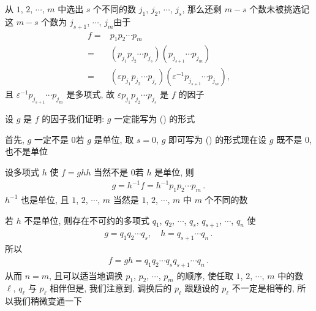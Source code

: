 \begin{pf}
    从 $1$, $2$, $\cdots$, $m$ 中选出 $s$ 个不同的数 $j_1$, $j_2$, $\cdots$, $j_s$, 那么还剩 $m-s$ 个数未被挑选\period 记这 $m-s$ 个数为 $j_{s+1}$, $\cdots$, $j_m$\period 由于
    \begin{align*}
        f
        = {} & p_1 p_2 \cdots p_m                                                                          \\
        = {} & (p_{j_1} p_{j_2} \cdots p_{j_s}) (p_{j_{s+1}} \cdots p_{j_m})                               \\
        = {} & (\varepsilon p_{j_1} p_{j_2} \cdots p_{j_s}) (\varepsilon^{-1} p_{j_{s+1}} \cdots p_{j_m}),
    \end{align*}
    且 $\varepsilon^{-1} p_{j_{s+1}} \cdots p_{j_m}$ 是多项式, 故 $\varepsilon p_{j_1} p_{j_2} \cdots p_{j_s}$ 是 $f$ 的因子\period

    设 $g$ 是 $f$ 的因子\period 我们证明: $g$ 一定能写为 (\myStar) 的形式\period

    首先, $g$ 一定不是 $0$\period 若 $g$ 是单位, 取 $s = 0$, $g$ 即可写为 (\myStar) 的形式\period 现在设 $g$ 既不是 $0$, 也不是单位\period

    设多项式 $h$ 使 $f = gh$\period $h$ 当然不是 $0$\period 若 $h$ 是单位, 则
    \begin{align*}
        g = h^{-1} f = h^{-1} p_1 p_2 \cdots p_m \period
    \end{align*}
    $h^{-1}$ 也是单位, 且 $1$, $2$, $\cdots$, $m$ 当然是 $1$, $2$, $\cdots$, $m$ 中 $m$ 个不同的数\period

    若 $h$ 不是单位, 则存在不可约的多项式 $q_1$, $q_2$, $\cdots$, $q_s$, $q_{s+1}$, $\cdots$, $q_n$ 使
    \begin{align*}
        g = q_1 q_2 \cdots q_s, \quad h = q_{s+1} \cdots q_n \period
    \end{align*}
    所以
    \begin{align*}
        f = gh = q_1 q_2 \cdots q_s q_{s+1} \cdots q_n \period
    \end{align*}
    从而 $n = m$, 且可以适当地调换 $p_1$, $p_2$, $\cdots$, $p_m$ 的顺序, 使任取 $1$, $2$, $\cdots$, $m$ 中的数 $\ell$, $q_\ell$ 与 $p_\ell$ 相伴\period 但是, 我们注意到, 调换后的 $p_{\ell}$ 跟题设的 $p_{\ell}$ 不一定是相等的, 所以我们稍微变通一下\period


\end{pf}
